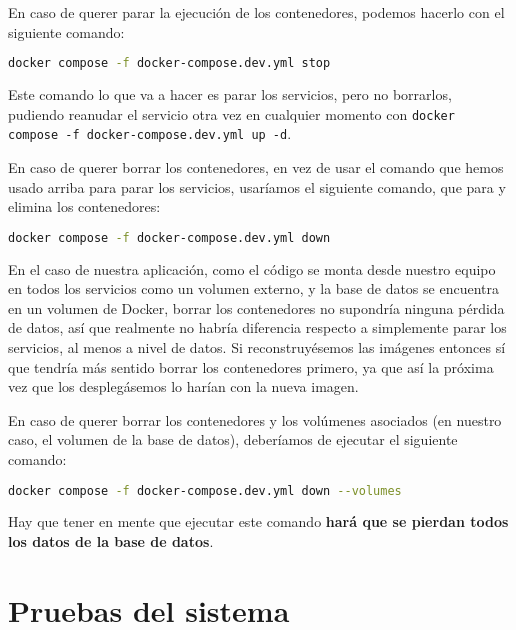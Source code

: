 
En caso de querer parar la ejecución de los contenedores, podemos hacerlo con el siguiente comando:

\begin{lstlisting}[language=Bash]
  docker compose -f docker-compose.dev.yml stop
\end{lstlisting}


Este comando lo que va a hacer es parar los servicios, pero no borrarlos, pudiendo reanudar el servicio otra vez en cualquier momento con \verb,docker compose -f docker-compose.dev.yml up -d,.


En caso de querer borrar los contenedores, en vez de usar el comando que hemos usado arriba para parar los servicios, usaríamos el siguiente comando, que para y elimina los contenedores:

\begin{lstlisting}[language=Bash]
  docker compose -f docker-compose.dev.yml down
\end{lstlisting}



En el caso de nuestra aplicación, como el código se monta desde nuestro equipo en todos los servicios como un volumen externo, y la base de datos se encuentra en un volumen de Docker, borrar los contenedores no supondría ninguna pérdida de datos, así que realmente no habría diferencia respecto a simplemente parar los servicios, al menos a nivel de datos. Si reconstruyésemos las imágenes entonces sí que tendría más sentido borrar los contenedores primero, ya que así la próxima vez que los desplegásemos lo harían con la nueva imagen.


En caso de querer borrar los contenedores y los volúmenes asociados (en nuestro caso, el volumen de la base de datos), deberíamos de ejecutar el siguiente comando:

\begin{lstlisting}[language=Bash]
  docker compose -f docker-compose.dev.yml down --volumes
\end{lstlisting}


Hay que tener en mente que ejecutar este comando \textbf{hará que se pierdan todos los datos de la base de datos}.

\section{Pruebas del sistema}
